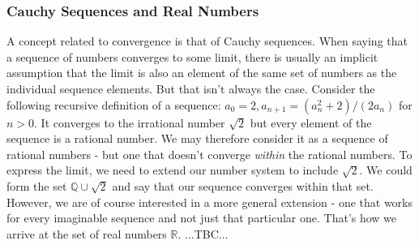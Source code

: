 \subsubsection{Cauchy Sequences and Real Numbers}
A concept related to convergence is that of Cauchy sequences. When saying that a sequence of numbers converges to some limit, there is usually an implicit assumption that the limit is also an element of the same set of numbers as the individual sequence elements. But that isn't always the case. Consider the following recursive definition of a sequence: $a_0 = 2, a_{n+1} = (a_n^2 + 2) / (2 a_n)$ for $n > 0$. It converges to the irrational number $\sqrt{2}$ but every element of the sequence is a rational number. We may therefore consider it as a sequence of rational numbers - but one that doesn't converge \emph{within} the rational numbers. To express the limit, we need to extend our number system to include $\sqrt{2}$. We could form the set $\mathbb{Q} \cup \sqrt{2}$ and say that our sequence converges within that set. However, we are of course interested in a more general extension - one that works for every imaginable sequence and not just that particular one. That's how we arrive at the set of real numbers $\mathbb{R}$. ...TBC...

%
%



